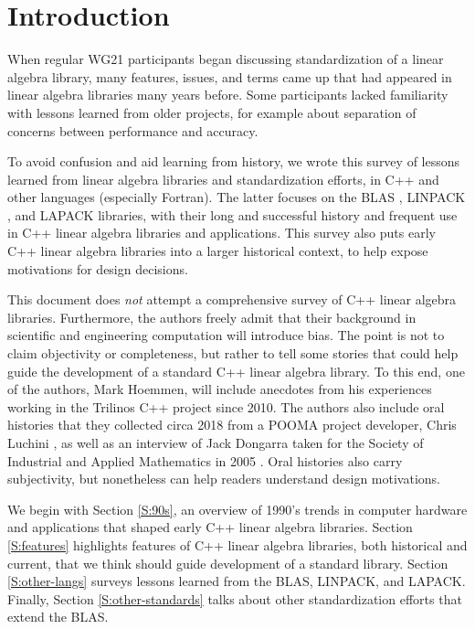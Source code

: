 \section{Introduction}
\label{S:intro}

When regular WG21 participants began discussing standardization of a
linear algebra library, many features, issues, and terms came up that
had appeared in linear algebra libraries many years before.  Some
participants lacked familiarity with lessons learned from older
projects, for example about separation of concerns between performance
and accuracy.

To avoid confusion and aid learning from history, we wrote this survey
of lessons learned from linear algebra libraries and standardization
efforts, in C++ and other languages (especially Fortran).  The latter
focuses on the BLAS \cite{BLAS-standard}, LINPACK
\cite{dongarra1979linpack}, and LAPACK \cite{LAPACK-Users-Guide}
libraries, with their long and successful history and frequent use in
C++ linear algebra libraries and applications.  This survey also puts
early C++ linear algebra libraries into a larger historical context,
to help expose motivations for design decisions.

This document does \emph{not} attempt a comprehensive survey of C++
linear algebra libraries.  Furthermore, the authors freely admit that
their background in scientific and engineering computation will
introduce bias.  The point is not to claim objectivity or
completeness, but rather to tell some stories that could help guide
the development of a standard C++ linear algebra library.  To this
end, one of the authors, Mark Hoemmen, will include anecdotes from his
experiences working in the Trilinos C++ project
\cite{heroux2005trilinos} since 2010.  The authors also include oral
histories that they collected circa 2018 from a POOMA project
developer, Chris Luchini \cite{hoemmen2018history}, as well as an
interview of Jack Dongarra taken for the Society of Industrial and
Applied Mathematics in 2005 \cite{dongarra2005history}.  Oral
histories also carry subjectivity, but nonetheless can help readers
understand design motivations.

We begin with Section \ref{S:90s}, an overview of 1990's trends in
computer hardware and applications that shaped early C++ linear
algebra libraries.  Section \ref{S:features} highlights features of
C++ linear algebra libraries, both historical and current, that we
think should guide development of a standard library.  Section
\ref{S:other-langs} surveys lessons learned from the BLAS, LINPACK,
and LAPACK.  Finally, Section \ref{S:other-standards} talks about
other standardization efforts that extend the BLAS.

